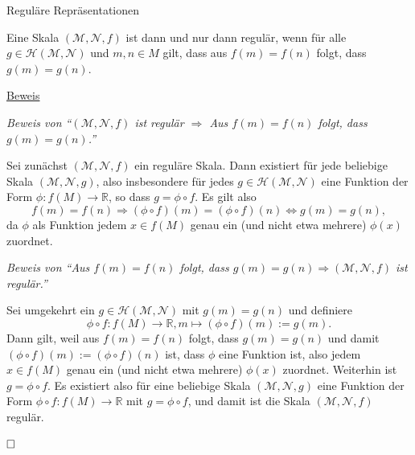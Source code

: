 \documentclass[
  8pt,
  ignorenonframetext,
]{beamer}
\begin{document}
\begin{frame}{Reguläre Repräsentationen}
\protect\hypertarget{reguluxe4re-repruxe4sentationen-5}{}
\small
\vspace{1mm}
\begin{theorem}
\justifying
\normalfont
Eine Skala $(\mathcal{M}, \mathcal{N},f)$ ist dann und nur dann regulär, wenn
für alle $g \in \mathcal{H}(\mathcal{M}, \mathcal{N})$ und $m,n \in M$ gilt, dass
aus $f(m) = f(n)$ folgt, dass $g(m) = g(n)$.
\end{theorem}

\footnotesize

\underline{Beweis}

\emph{Beweis von ``\((\mathcal{M}, \mathcal{N},f)\) ist regulär
\(\Rightarrow\) Aus \(f(m) = f(n)\) folgt, dass \(g(m) = g(n)\).''}

Sei zunächst \((\mathcal{M}, \mathcal{N},f)\) ein reguläre Skala. Dann
existiert für jede beliebige Skala \((\mathcal{M}, \mathcal{N},g)\),
also insbesondere für jedes
\(g \in \mathcal{H}(\mathcal{M}, \mathcal{N})\) eine Funktion der Form
\(\phi : f(M) \to \mathbb{R}\), so dass \(g = \phi \circ f\). Es gilt
also \begin{equation}
f(m) = f(n) \Rightarrow (\phi \circ f)(m) = (\phi \circ f)(n) \Leftrightarrow g(m) = g(n),
\end{equation} da \(\phi\) als Funktion jedem \(x \in f(M)\) genau ein
(und nicht etwa mehrere) \(\phi(x)\) zuordnet.

\vspace{1mm}

\emph{Beweis von ``Aus \(f(m) = f(n)\) folgt, dass
\(g(m) = g(n) \Rightarrow (\mathcal{M}, \mathcal{N},f)\) ist regulär.''}

Sei umgekehrt ein \(g \in \mathcal{H}(\mathcal{M}, \mathcal{N})\) mit
\(g(m) = g(n)\) und definiere \begin{equation}
\phi \circ f : f(M) \to \mathbb{R}, m \mapsto (\phi \circ f)(m) := g(m).
\end{equation} Dann gilt, weil aus \(f(m) = f(n)\) folgt, dass
\(g(m) = g(n)\) und damit \((\phi \circ f)(m) := (\phi \circ f)(n)\)
ist, dass \(\phi\) eine Funktion ist, also jedem \(x \in f(M)\) genau
ein (und nicht etwa mehrere) \(\phi(x)\) zuordnet. Weiterhin ist
\(g = \phi \circ f\). Es existiert also für eine beliebige Skala
\((\mathcal{M}, \mathcal{N},g)\) eine Funktion der Form
\(\phi \circ f : f(M) \to \mathbb{R}\) mit \(g = \phi \circ f\), und
damit ist die Skala \((\mathcal{M}, \mathcal{N},f)\) regulär.

\(\hfill\Box\)
\end{frame}
\end{document}
